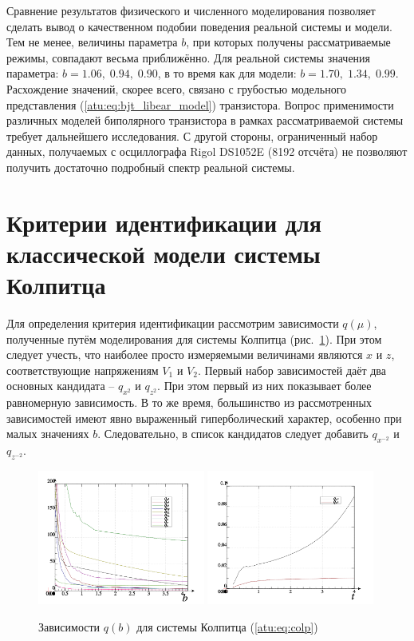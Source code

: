 Сравнение результатов физического и численного моделирования позволяет сделать вывод
о качественном подобии поведения реальной системы и модели.
Тем не менее, величины параметра $b$, при которых получены
рассматриваемые режимы, совпадают весьма приближённо.
Для реальной системы значения параметра: $b = 1.06, \; 0.94, \; 0.90 $, в то время как
для модели: $b = 1.70, \; 1.34, \; 0.99 $.
Расхождение значений, скорее всего, связано с грубостью модельного представления (\ref{atu:eq:bjt_libear_model}) транзистора.
Вопрос применимости различных моделей биполярного транзистора в рамках рассматриваемой системы
требует дальнейшего исследования.
С другой стороны, ограниченный набор данных, получаемых с осциллографа Rigol DS1052E (8192 отсчёта) не позволяют
получить достаточно подробный спектр реальной системы.


\section{Критерии идентификации для классической модели системы Колпитца}  %

Для определения критерия идентификации рассмотрим зависимости
$q(\mu) $, полученные путём моделирования
для системы Колпитца (рис.~\ref{atu:f:colp_q}).
При этом следует учесть, что наиболее просто измеряемыми величинами являются $x$ и $z$,
соответствующие напряжениям $V_1$ и $V_2$.
Первый набор зависимостей даёт два основных кандидата -- $q_{x^2}$ и $q_{z^2}$.
При этом первый из них показывает более равномерную зависимость.
В то же время, большинство из рассмотренных зависимостей имеют явно
выраженный гиперболический характер, особенно при малых значениях $b$.
Следовательно, в список кандидатов следует добавить $q_{x^{-2}} $ и $q_{z^{-2}}$.

\begin{figure}[htb!]
\centerline{
  \includegraphics[width=0.49\textwidth]{p/mod/colp_p-p_b_e.png}
  \includegraphics[width=0.49\textwidth]{p/mod/colp_p-p_b_1ex2.png}
}
  \caption{Зависимости $q(b) $ для системы Колпитца (\ref{atu:eq:colp})}
\label{atu:f:colp_q}
\end{figure}

